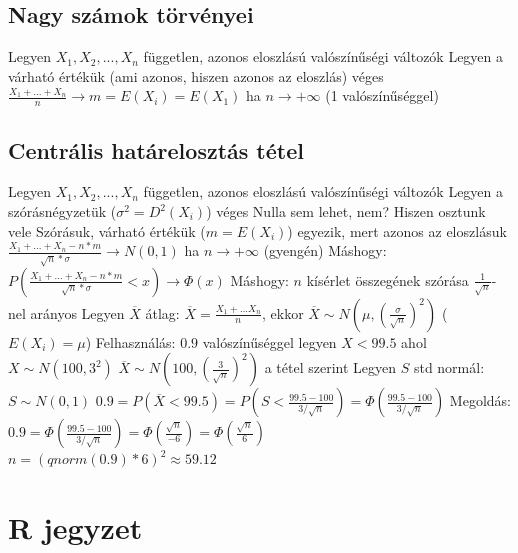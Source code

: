 \documentclass[12pt,a4paper]{article}
\begin{document}
\subsection{Nagy számok törvényei}

\begin{outline}
	\1 Legyen $X_1, X_2, ..., X_n$ független, azonos eloszlású valószínűségi változók
	\1 Legyen a várható értékük (ami azonos, hiszen azonos az eloszlás) véges
	\1 $\frac{X_1 + ... + X_n}{n} \to m = E(X_i) = E(X_1)$ ha $n \to +\infty$
	\;\; (1 valószínűséggel)
\end{outline}

\pagebreak

\subsection{Centrális határelosztás tétel}

\begin{outline}
	\1 Legyen $X_1, X_2, ..., X_n$ független, azonos eloszlású valószínűségi változók
	\1 Legyen a szórásnégyzetük ($\sigma^2 = D^2(X_i)$) véges
		\2 Nulla sem lehet, nem? Hiszen osztunk vele
	\1 Szórásuk, várható értékük ($m=E(X_i)$) egyezik, mert azonos az eloszlásuk
	\1 $\frac{X_1 + ... + X_n - n*m}{\sqrt{n} * \sigma} \to N(0,1)$ ha $n \to +\infty$
	\;\; (gyengén)
		\2 Máshogy: $P(\frac{X_1 + ... + X_n - n*m}{\sqrt{n} * \sigma} < x) \to \Phi(x)$
		\2 Máshogy: $n$ kísérlet összegének szórása $\frac{1}{\sqrt{n}}$-nel arányos
	\1 Legyen $\overline{X}$ átlag: $\overline{X} = \frac{X_1 + ... X_n}{n}$,
	ekkor $\overline{X} \sim N(\mu, (\frac{\sigma}{\sqrt{n}})^2)$ \;\; ($E(X_i) = \mu$)
	\1 Felhasználás: $0.9$ valószínűséggel legyen $X < 99.5$ ahol $X \sim N(100, 3^2)$
		\2 $\overline{X} \sim N(100, (\frac{3}{\sqrt{n}})^2)$ a tétel szerint
		\2 Legyen $S$ std normál: $S \sim N(0,1)$
		\2 $0.9 = P(\overline{X} < 99.5) = P(S < \frac{99.5-100}{3/\sqrt{n}}) = \Phi(\frac{99.5-100}{3/\sqrt{n}})$
		\2 Megoldás: $0.9 = \Phi(\frac{99.5-100}{3/\sqrt{n}}) = \Phi(\frac{\sqrt{n}}{-6}) = \Phi(\frac{\sqrt{n}}{6})$\\
		$n=(qnorm(0.9) * 6)^2 \approx 59.12$
\end{outline}

\pagebreak

\section{R jegyzet}
\end{document}
